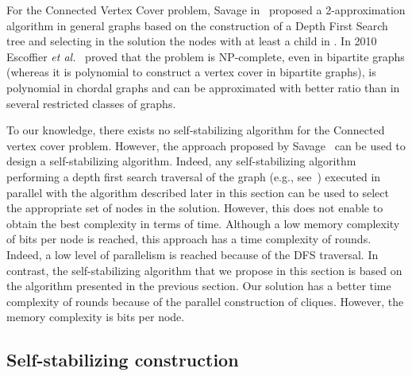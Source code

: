 \documentclass[11pt,letterpaper,onecolumn]{article}
\begin{document}
For the Connected Vertex Cover problem, Savage in~\cite{Savage82} proposed a 2-approximation algorithm in general graphs based on the construction of a Depth First Search tree  and selecting in the solution the nodes with at least a child in . In 2010 Escoffier \emph{et al.}~\cite{EscoffierGouvesMonnot10} proved that the problem is NP-complete, even in bipartite graphs (whereas it is polynomial to construct a vertex cover in bipartite graphs), is polynomial in chordal graphs and can be approximated with better ratio than  in several restricted classes of graphs.

To our knowledge, there exists no self-stabilizing algorithm for the Connected vertex cover problem. However, the approach proposed by Savage~\cite{Savage82} can be used to design a self-stabilizing algorithm. Indeed, any self-stabilizing algorithm performing a depth first search traversal of the graph (e.g., see~\cite{CollinD94,CournierDPV06,PetitV07}) executed in parallel with the algorithm described later in this section can be used to select the appropriate set of nodes in the solution. However, this does not enable to obtain the best complexity in terms of time. Although a low memory complexity of  bits per node is reached, this approach has a time complexity of  rounds. Indeed, a low level of parallelism is reached because of the DFS traversal. In contrast, the self-stabilizing algorithm that we propose in this section is based on the algorithm presented in the previous section. Our solution has a better time complexity of  rounds because of the parallel construction of cliques. However, the memory complexity is  bits per node.

\subsection{Self-stabilizing construction}
\end{document}
